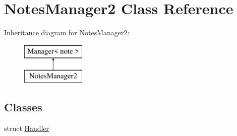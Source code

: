 \hypertarget{class_notes_manager2}{}\section{Notes\+Manager2 Class Reference}
\label{class_notes_manager2}
Inheritance diagram for Notes\+Manager2\+:\begin{figure}[H]
\begin{center}
\leavevmode
\includegraphics[height=2.000000cm]{class_notes_manager2}
\end{center}
\end{figure}
\subsection*{Classes}
\begin{DoxyCompactItemize}
\item 
struct \hyperlink{struct_notes_manager2_1_1_handler}{Handler}
\end{DoxyCompactItemize}
